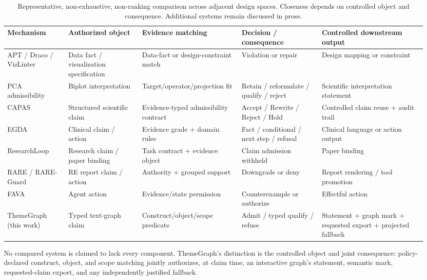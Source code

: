 \documentclass[manuscript,screen,review]{acmart}
\begin{document}
\begin{table}[t]
  \caption{Representative, non-exhaustive, non-ranking comparison across adjacent design spaces. Closeness depends on controlled object and consequence. Additional systems remain discussed in prose.}
  \label{tab:prior-art}
  \centering
  \footnotesize
  \setlength{\tabcolsep}{2.5pt}
  \begin{tabular}{@{}p{}p{}p{}p{}p{}@{}}
    \toprule
    Mechanism & Authorized object & Evidence matching & Decision / consequence & Controlled downstream output \\
    \midrule
    APT / Draco / VizLinter \cite{mackinlay1986,moritz2019,chen2022} & Data fact / visualization specification & Data-fact or design-constraint match & Violation or repair & Design mapping or constraint \\
    PCA admissibility \cite{pinto2026} & Biplot interpretation & Target/operator/projection fit & Retain / reformulate / qualify / reject & Scientific interpretation statement \\
    CAPAS \cite{capas2026} & Structured scientific claim & Evidence-typed admissibility contract & Accept / Rewrite / Reject / Hold & Controlled claim reuse + audit trail \\
    EGDA \cite{lin2026egda} & Clinical claim / action & Evidence grade + domain rules & Fact / conditional / next step / refusal & Clinical language or action output \\
    ResearchLoop \cite{researchloop2026} & Research claim / paper binding & Task contract + evidence object & Claim admission withheld & Paper binding \\
    RARE / RARE-Guard \cite{rare2026} & RE report claim / action & Authority + grouped support & Downgrade or deny & Report rendering / tool promotion \\
    FAVA \cite{fava2026} & Agent action & Evidence/state permission & Counterexample or authorize & Effectful action \\
    ThemeGraph (this work) & Typed text-graph claim & Construct/object/scope predicate & Admit / typed qualify / refuse & Statement + graph mark + requested export + projected fallback \\
    \bottomrule
  \end{tabular}
\end{table}

No compared system is claimed to lack every component. ThemeGraph's distinction is the controlled object and joint consequence: policy-declared construct, object, and scope matching jointly authorizes, at claim time, an interactive graph's statement, semantic mark, requested-claim export, and any independently justified fallback.
\end{document}
